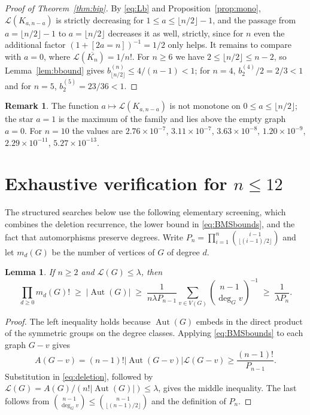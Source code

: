 \documentclass[11pt]{article}
\newtheorem{lemma}[theorem]{Lemma}
\theoremstyle{definition}
\newtheorem{remark}[theorem]{Remark}
\DeclareMathOperator{\Aut}{Aut}
\newcommand{\Lk}{\mathcal{L}}
\newcommand{\bin}[2]{\binom{#1}{#2}}
\begin{document}
\begin{proof}[Proof of Theorem~\ref{thm:bip}]
By \eqref{eq:Lb} and Proposition~\ref{prop:mono}, $\Lk(K_{a,n-a})$ is strictly decreasing for $1\le a\le\lfloor n/2\rfloor-1$, and the passage from $a=\lfloor n/2\rfloor -1$ to $a=\lfloor n/2\rfloor$ decreases it as well, strictly, since for $n$ even the additional factor $(1+[2a=n])^{-1}=1/2$ only helps. It remains to compare with $a=0$, where $\Lk(\overline{K_n})=1/n!$. For $n\ge 6$ we have $2\le\lfloor n/2\rfloor\le n-2$, so Lemma~\ref{lem:bbound} gives $b^{(n)}_{\lfloor n/2\rfloor}\le 4/(n-1)<1$; for $n=4$, $b_2^{(4)}/2=2/3<1$ and for $n=5$, $b^{(5)}_2=23/36<1$.
\end{proof}

\begin{remark}
The function $a\mapsto\Lk(K_{a,n-a})$ is not monotone on $0\le a\le\lfloor n/2\rfloor$; the star $a=1$ is the maximum of the family and lies above the empty graph $a=0$. For $n=10$ the values are $2.76\times 10^{-7}$, $3.11\times 10^{-7}$, $3.63\times 10^{-8}$, $1.20\times 10^{-9}$, $2.29\times 10^{-11}$, $5.27\times 10^{-13}$.
\end{remark}

\section{Exhaustive verification for \texorpdfstring{$n\le 12$}{n <= 12}}\label{sec:small}

The structured searches below use the following elementary screening, which
combines the deletion recurrence, the lower bound in \eqref{eq:BMSbounds},
and the fact that automorphisms preserve degrees. Write
$P_n=\prod_{i=1}^{n}\bin{i-1}{\lfloor (i-1)/2\rfloor}$ and let $m_d(G)$ be
the number of vertices of $G$ of degree $d$.

\begin{lemma}\label{lem:screen}
If $n\ge2$ and $\Lk(G)\le\lambda$, then
\[
\prod_{d\ge0}m_d(G)!\;\ge\;\lvert\Aut(G)\rvert\;\ge\;
\frac{1}{n\lambda P_{n-1}}
\sum_{v\in V(G)}\bin{n-1}{\deg_Gv}^{-1}
\;\ge\;\frac{1}{\lambda P_n}.
\]
\end{lemma}

\begin{proof}
The left inequality holds because $\Aut(G)$ embeds in the direct product of
the symmetric groups on the degree classes.  Applying \eqref{eq:BMSbounds}
to each graph $G-v$ gives
\[
A(G-v)=(n-1)!\lvert\Aut(G-v)\rvert\Lk(G-v)\ge\frac{(n-1)!}{P_{n-1}}.
\]
Substitution in \eqref{eq:deletion}, followed by
$\Lk(G)=A(G)/(n!\lvert\Aut(G)\rvert)\le\lambda$, gives the middle inequality.  The
last follows from
$\bin{n-1}{\deg_Gv}\le\bin{n-1}{\lfloor(n-1)/2\rfloor}$ and the definition
of $P_n$.
\end{proof}
\end{document}
